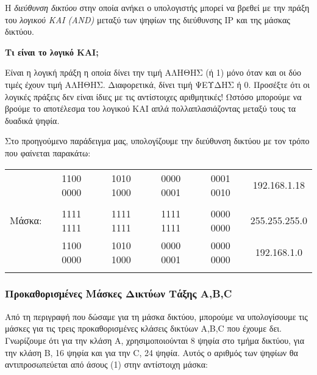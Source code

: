 H \emph{διεύθυνση δικτύου} στην οποία ανήκει ο υπολογιστής μπορεί να βρεθεί με την πράξη του \emph{λογικού KAI (AND)} μεταξύ των ψηφίων της διεύθυνσης IP και της μάσκας δικτύου. 

\begin{inthebox}
\textbf{Τι είναι το λογικό KAI;}

Είναι η λογική πράξη η οποία δίνει την τιμή ΑΛΗΘΗΣ (ή 1) μόνο όταν και οι δύο τιμές έχουν τιμή ΑΛΗΘΗΣ. Διαφορετικά, δίνει τιμή ΨΕΥΔΗΣ ή 0. Προσέξτε ότι οι λογικές πράξεις δεν είναι ίδιες με τις αντίστοιχες αριθμητικές! Ωστόσο μπορούμε να βρούμε το αποτέλεσμα του λογικού ΚΑΙ απλά πολλαπλασιάζοντας μεταξύ τους τα δυαδικά ψηφία.\\
\end{inthebox}

Στο προηγούμενο παράδειγμα μας, υπολογίζουμε την διεύθυνση δικτύου με τον τρόπο που φαίνεται  παρακάτω:

\begin{center}
\fontsize{9}{11}
\ttfamily
\begin{tabular}{|c|c|c|c|c|c|} 
\hline
\multirow{2}{*}{} Διεύθυνση & 1100 0000 & 1010 1000 & 0000 0001 & 0001 0010 & 192.168.1.18 \\
IP: & & & & & \\
\hline
Μάσκα: & 1111 1111 & 1111 1111 & 1111 1111 & 0000 0000 & 255.255.255.0 \\
\hline
\multirow{2}{*}{} Διεύθυνση & 1100 0000 & 1010 1000 & 0000 0001 & 0000 0000 & 192.168.1.0 \\
Δικτύου: & & & & & \\
\hline
\end{tabular}
\normalfont
\end{center}

\subsubsection*{Προκαθορισμένες Μάσκες Δικτύων Τάξης A,B,C}

Από τη περιγραφή που δώσαμε για τη μάσκα δικτύου, μπορούμε να υπολογίσουμε τις μάσκες για τις τρεις προκαθορισμένες κλάσεις δικτύων A,B,C που έχουμε δει. Γνωρίζουμε ότι για την κλάση Α, χρησιμοποιούνται 8 ψηφία στο τμήμα δικτύου, για την  κλάση B, 16 ψηφία και για την C, 24 ψηφία. Αυτός ο αριθμός των ψηφίων θα αντιπροσωπεύεται από άσους (1) στην αντίστοιχη μάσκα:

